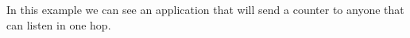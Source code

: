 In this example we can see an application that will send a counter to anyone that can listen in one hop. 